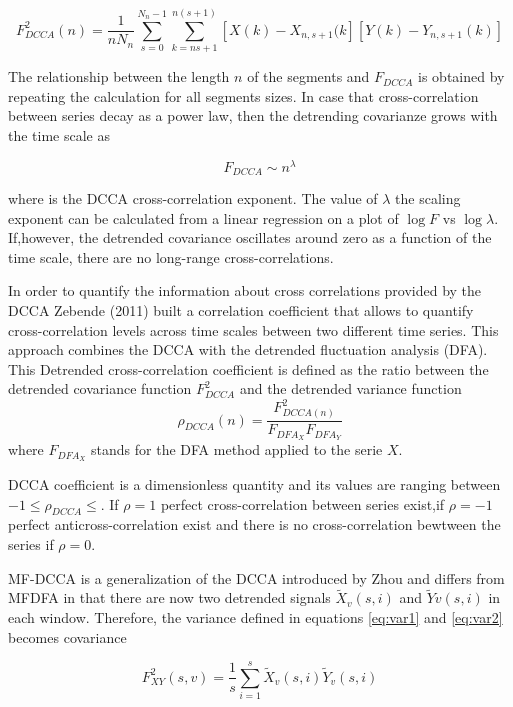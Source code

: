 \documentclass[onecolumn, preprint,aps,amsmath, amssymb, superscriptaddress]{revtex4}
\begin{document}
\begin{equation}
F^2_{DCCA}(n) = \dfrac{1}{nN_n}\sum_{s=0}^{N_n-1}\sum_{k=ns+1}^{n(s+1)}\left[X(k)-X_{n,s+1}(k\right] \left[Y(k)-Y_{n,s+1}(k)\right]
\end{equation}

The relationship between the length $n$ of the segments and $F_{DCCA}$ is obtained by repeating the calculation for all segments sizes. In case that cross-correlation between series decay as a power law, then the detrending covarianze grows with the time scale as

\begin{equation}
F_{DCCA}\sim n^\lambda
\end{equation}

where  is the DCCA cross-correlation exponent. The value of $\lambda$ the scaling exponent can be calculated from a linear regression on a plot of $\log F$ vs $\log \lambda$. If,however, the detrended covariance oscillates around zero as a function of the time scale, there are no long-range cross-correlations.

In order to quantify the information about cross correlations provided by the DCCA Zebende (2011) built a correlation coefficient that allows to quantify cross-correlation levels across time scales between two different time series. This approach combines the DCCA with the detrended fluctuation analysis (DFA). This Detrended cross-correlation coefficient is defined as the ratio between the detrended covariance function $F^2_{DCCA}$ and the detrended variance function \cite{Zebende}
\begin{equation}
    \rho_{DCCA}(n) =\dfrac{F^2_{DCCA(n)}}{F_{DFA_X}F_{DFA_Y}}
\end{equation}
where $F_{DFA_X}$ stands for the DFA method applied to the serie $X$.

DCCA coefficient is a dimensionless quantity and its
values are ranging between $-1 \leq \rho_{DCCA} \leq$. If $\rho = 1$ perfect cross-correlation between series exist,if $\rho = -1$ perfect anticross-correlation exist and there is no cross-correlation bewtween the series if $\rho = 0$. 

MF-DCCA is a generalization of the DCCA introduced by Zhou \cite{Zhou} and differs from MFDFA in that there are now two detrended signals  $\tilde{X}_v(s,i)$ and $\tilde{Y}v(s,i)$ in each window. Therefore, the variance defined in equations \ref{eq:var1} and \ref{eq:var2} becomes covariance

\begin{equation}
F_{XY}^2 (s,v)=\frac{1}{s} \sum_{i=1}^s\tilde{X}_v(s,i)\tilde{Y}_v(s,i)
\end{equation}
\end{document}

